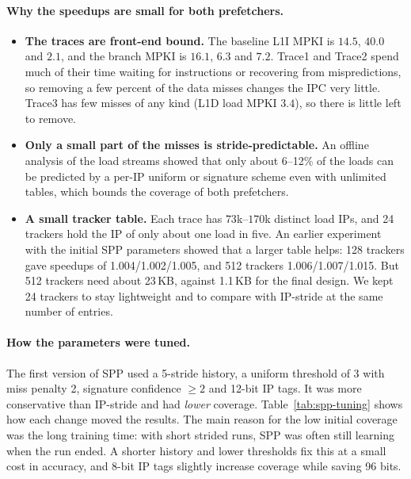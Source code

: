 \documentclass[11pt,a4paper]{article}
\begin{document}
\paragraph{Why the speedups are small for both prefetchers.}
\begin{itemize}
    \item \textbf{The traces are front-end bound.} The baseline L1I MPKI is $14.5$, $40.0$ and
          $2.1$, and the branch MPKI is $16.1$, $6.3$ and $7.2$. Trace1 and Trace2 spend much of their
          time waiting for instructions or recovering from mispredictions, so removing a few
          percent of the data misses changes the IPC very little. Trace3 has few misses of any
          kind (L1D load MPKI $3.4$), so there is little left to remove.
    \item \textbf{Only a small part of the misses is stride-predictable.} An offline analysis of
          the load streams showed that only about 6--12\% of the loads can be predicted by a per-IP
          uniform or signature scheme even with unlimited tables, which bounds the coverage of both
          prefetchers.
    \item \textbf{A small tracker table.} Each trace has $73$k--$170$k distinct load IPs, and
          24 trackers hold the IP of only about one load in five. An earlier experiment with the
          initial SPP parameters showed that a larger table helps: 128 trackers gave speedups of
          1.004/1.002/1.005, and 512 trackers 1.006/1.007/1.015. But 512 trackers need about
          23\,KB, against 1.1\,KB for the final design. We kept 24 trackers to stay lightweight
          and to compare with IP-stride at the same number of entries.
\end{itemize}

\paragraph{How the parameters were tuned.}
The first version of SPP used a 5-stride history, a uniform threshold of 3 with miss penalty 2,
signature confidence $\ge 2$ and 12-bit IP tags. It was more conservative than IP-stride and had
\emph{lower} coverage. Table~\ref{tab:spp-tuning} shows how each change moved the results. The
main reason for the low initial coverage was the long training time: with short strided runs,
SPP was often still learning when the run ended. A shorter history and lower thresholds fix this
at a small cost in accuracy, and 8-bit IP tags slightly increase coverage while saving 96 bits.
\end{document}
